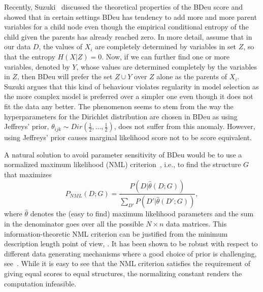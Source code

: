Recently, Suzuki~\cite{Suzuki2017} discussed the theoretical
properties of the BDeu score and showed that in certain settings BDeu
has tendency to add more and more parent variables for a child node
even though the empirical conditional entropy of the child given the
parents has already reached zero. In more detail, assume that in our
data $D$, the values of $X_i$ are completely determined by variables
in set $Z$, so that the entropy $H(X | Z) = 0$. Now, if we can further
find one or more variables, denoted by $Y$, whose values are
determined completely by the variables in $Z$, then BDeu will prefer
the set $Z\cup Y$ over $Z$ alone as the parents of $X_i$. Suzuki
argues that this kind of behaviour violates regularity in model
selection as the more complex model is preferred over a simpler one
even though it does not fit the data any better. The phenomenon seems
to stem from the way the hyperparameters for the Dirichlet
distribution are chosen in BDeu as using Jeffreys' prior,
$\theta_{ijk}\sim Dir(\frac{1}{2},\ldots,\frac{1}{2})$, does not suffer
from this anomaly. However, using Jeffreys' prior causes marginal
likelihood score not to be score equivalent.

A natural solution to avoid parameter sensitivity of BDeu would be to
use a normalized maximum likelihood (NML)
criterion~\cite{Shta87,Riss96a}, i.e., to find the structure $G$ that
maximizes
\begin{equation}
P_{NML}(D;G)=\frac{P(D|\hat\theta(D;G))}{\sum_{D'}{P(D'|\hat\theta(D';G))}},
\end{equation}
where $\hat\theta$ denotes the (easy to find) maximum likelihood
parameters and the sum in the denominator goes over all the possible
$N\times n$ data matrices. This information-theoretic NML criterion
can be justified from the minimum description length point of view,
\cite{Riss78,Grun07}. It has been shown to be robust with respect to
different data generating mechanisms where a good choice of prior
is challenging, see~\cite{eggeling2014robust,maatta16}. While it is
easy to see that the NML criterion satisfies the requirement of giving
equal scores to equal structures, the normalizing constant renders the
computation infeasible.

